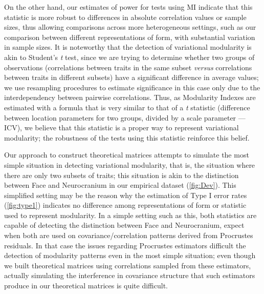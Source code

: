 \documentclass[12pt,twoside]{report}
\begin{document}
On the other hand, our estimates of power for tests using MI indicate
that this statistic is more robust to differences in absolute
correlation values or sample sizes, thus allowing comparisons across
more heterogeneous settings, such as our comparison between different
representations of form, with substantial variation in sample sizes. It
is noteworthy that the detection of variational modularity is akin to
Student's \emph{t} test, since we are trying to determine whether two
groups of observations (correlations between traits in the same subset
\emph{versus} correlations between traits in different subsets) have a
significant difference in average values; we use resampling procedures
to estimate significance in this case only due to the interdependency
between pairwise correlations. Thus, as Modularity Indexes are estimated
with a formula that is very similar to that of a \emph{t} statistic
(difference between location parameters for two groups, divided by a
scale parameter --- ICV), we believe that this statistic is a proper way
to represent variational modularity; the robustness of the tests using
this statistic reinforce this belief.

Our approach to construct theoretical matrices attempts to simulate the
most simple situation in detecting variational modularity, that is, the
situation where there are only two subsets of traits; this situation is
akin to the distinction between Face and Neurocranium in our empirical
dataset (\autoref{fig:Dev}). This simplified setting may be the reason
why the estimation of Type I error rates (\autoref{fig:type1}) indicates
no difference among representations of form or statistic used to
represent modularity. In a simple setting such as this, both statistics
are capable of detecting the distinction between Face and Neurocranium,
expect when both are used on covariance/correlation patterns derived
from Procrustes residuals. In that case the issues regarding Procrustes
estimators difficult the detection of modularity patterns even in the
most simple situation; even though we built theoretical matrices using
correlations sampled from these estimators, actually simulating the
interference in covariance structure that such estimators produce in our
theoretical matrices is quite difficult.
\end{document}
